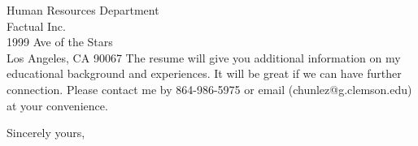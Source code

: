 \documentclass[11pt]{letter} %
\begin{document}
\begin{letter}{Human Resources Department \\
		Factual Inc. \\
1999 Ave of the Stars\\ Los Angeles, CA 90067}
The resume will give you additional information on my educational background and experiences. It will be great if we can have further connection. Please contact me by 864-986-5975 or email (chunlez@g.clemson.edu) at your convenience.




\closing{Sincerely yours,}




\end{letter}
\end{document}
